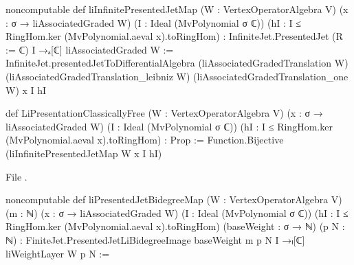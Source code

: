 \begin{leancode}
noncomputable def liInfinitePresentedJetMap (W : VertexOperatorAlgebra V)
    (x : σ → liAssociatedGraded W) (I : Ideal (MvPolynomial σ ℂ))
    (hI : I ≤ RingHom.ker (MvPolynomial.aeval x).toRingHom) :
    InfiniteJet.PresentedJet (R := ℂ) I →ₐ[ℂ] liAssociatedGraded W :=
  InfiniteJet.presentedJetToDifferentialAlgebra (liAssociatedGradedTranslation W)
    (liAssociatedGradedTranslation_leibniz W) (liAssociatedGradedTranslation_one W) x I hI

def LiPresentationClassicallyFree (W : VertexOperatorAlgebra V)
    (x : σ → liAssociatedGraded W) (I : Ideal (MvPolynomial σ ℂ))
    (hI : I ≤ RingHom.ker (MvPolynomial.aeval x).toRingHom) : Prop :=
  Function.Bijective (liInfinitePresentedJetMap W x I hI)
\end{leancode}
\noindent File .
\begin{leancode}
noncomputable def liPresentedJetBidegreeMap
    (W : VertexOperatorAlgebra V) (m : ℕ)
    (x : σ → liAssociatedGraded W) (I : Ideal (MvPolynomial σ ℂ))
    (hI : I ≤ RingHom.ker (MvPolynomial.aeval x).toRingHom)
    (baseWeight : σ → ℕ) (p N : ℕ) :
    FiniteJet.PresentedJetLiBidegreeImage baseWeight m p N I →ₗ[ℂ]
      liWeightLayer W p N :=
\end{leancode}

